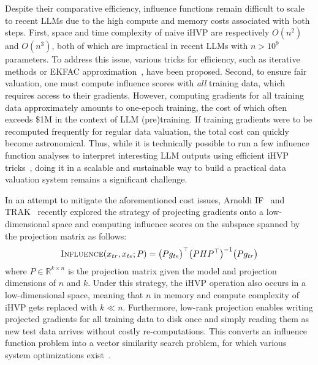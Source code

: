 Despite their comparative efficiency, influence functions remain difficult to scale to recent LLMs due to the high compute and memory costs associated with both steps.
First, space and time complexity of naive iHVP are respectively $O(n^2)$ and $O(n^3)$, both of which are impractical in recent LLMs with $n>10^9$ parameters. To address this issue, various tricks for efficiency, such as iterative methods \cite{koh2017understanding} or EKFAC approximation~\cite{grosse2023studying}, have been proposed. Second, to ensure fair valuation, one must compute influence scores with \textit{all} training data, which requires access to their gradients. However, computing gradients for all training data approximately amounts to one-epoch training, the cost of which often exceeds \$1M in the context of LLM (pre)training. If training gradients were to be recomputed frequently for regular data valuation, the total cost can quickly become astronomical. Thus, while it is technically possible to run a few influence function analyses to interpret interesting LLM outputs using efficient iHVP tricks~\cite{grosse2023studying}, doing it in a scalable and sustainable way to build a practical data valuation system remains a significant challenge.

In an attempt to mitigate the aforementioned cost issues, Arnoldi IF~\cite{schioppa2022scaling} and TRAK~\cite{park2023trak} recently explored the strategy of projecting gradients onto a low-dimensional space and computing influence scores on the subspace spanned by the projection matrix as follows:
\begin{align}
    \textsc{Influence}(x_{tr}, x_{te};P) =\big(Pg_{te}\big)^\top\big(PHP^\top\big)^{-1}\big(Pg_{tr}\big)\label{eq:if_proj}
\end{align}
where $P\in\mathbb{R}^{k\times n}$ is the projection matrix given the model and projection dimensions of $n$ and $k$. Under this strategy, the iHVP operation also occurs in a low-dimensional space, meaning that $n$ in memory and compute complexity of iHVP gets replaced with $k\ll n$. Furthermore, low-rank projection enables writing projected gradients for all training data to disk once and simply reading them as new test data arrives without costly re-computations. This converts an influence function problem  into a vector similarity search problem, for which various system optimizations exist~\cite{johnson2019billion}.

